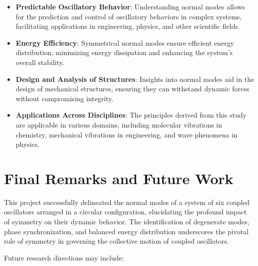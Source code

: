 \documentclass[12pt]{report} %
\begin{document}
\begin{itemize}
    \item \textbf{Predictable Oscillatory Behavior}: Understanding normal modes allows for the prediction and control of oscillatory behaviors in complex systems, facilitating applications in engineering, physics, and other scientific fields.

    \item \textbf{Energy Efficiency}: Symmetrical normal modes ensure efficient energy distribution, minimizing energy dissipation and enhancing the system's overall stability.

    \item \textbf{Design and Analysis of Structures}: Insights into normal modes aid in the design of mechanical structures, ensuring they can withstand dynamic forces without compromising integrity.

    \item \textbf{Applications Across Disciplines}: The principles derived from this study are applicable in various domains, including molecular vibrations in chemistry, mechanical vibrations in engineering, and wave phenomena in physics.
\end{itemize}



\section{Final Remarks and Future Work}
\label{sec:conclusion_final_remarks}

This project successfully delineated the normal modes of a system of six coupled oscillators arranged in a circular configuration, elucidating the profound impact of symmetry on their dynamic behavior. The identification of degenerate modes, phase synchronization, and balanced energy distribution underscores the pivotal role of symmetry in governing the collective motion of coupled oscillators.

Future research directions may include:
\end{document}
